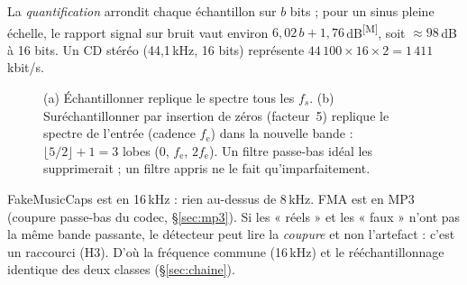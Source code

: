 \documentclass[10pt,a4paper]{article}
\newcommand{\sM}{\textsuperscript{\scriptsize\textcolor{red!70!black}{[M]}}}
\begin{document}
La \emph{quantification} arrondit chaque échantillon sur $b$ bits ; pour un sinus pleine échelle, le rapport signal sur bruit vaut environ $6{,}02\,b+1{,}76$\,dB\sM, soit $\ensuremath{\approx}98$\,dB à 16 bits. Un CD stéréo (44,1\,kHz, 16 bits) représente $44\,100\times16\times2=1\,411$\,kbit/s.

\begin{figure}[ht]
\centering
{}
\caption{(a) Échantillonner replique le spectre tous les $f_s$. (b) Suréchantillonner par insertion de zéros (facteur~5) replique le spectre de l'entrée (cadence $f_{\mathrm e}$) dans la nouvelle bande : $\lfloor 5/2\rfloor+1=3$ lobes (0, $f_{\mathrm e}$, $2f_{\mathrm e}$). Un filtre passe-bas idéal les supprimerait ; un filtre appris ne le fait qu'imparfaitement.}\label{fig:repliques}
\end{figure}

\begin{projet}
FakeMusicCaps est en 16\,kHz : rien au-dessus de 8\,kHz. FMA est en MP3 (coupure passe-bas du codec, §\ref{sec:mp3}). Si les « réels » et les « faux » n'ont pas la même bande passante, le détecteur peut lire la \emph{coupure} et non l'artefact : c'est un raccourci (H3). D'où la fréquence commune (16\,kHz) et le rééchantillonnage identique des deux classes (§\ref{sec:chaine}).
\end{projet}
\end{document}
